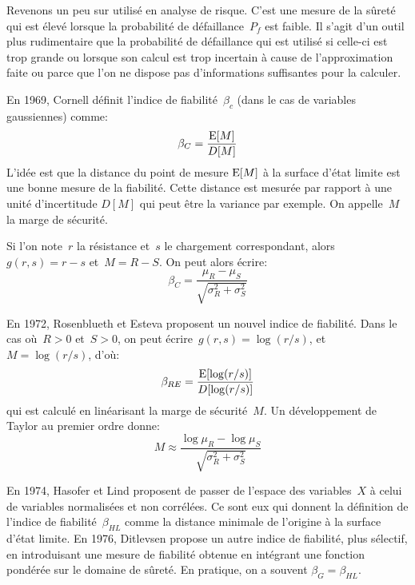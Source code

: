 \begin{histoire}
\medskip\ifVersionDuDocEstVincent\else\vspace{\medskipamount}\fi
Revenons un peu sur  utilisé en analyse de risque. C'est une mesure de la sûreté qui est élevé lorsque la probabilité de défaillance~$P_f$ est faible. Il s'agit d'un outil plus rudimentaire que la probabilité de défaillance qui est utilisé si celle-ci est trop grande ou lorsque son calcul est trop incertain à cause de l'approximation faite ou parce que l'on ne dispose pas d'informations suffisantes pour la calculer.

En 1969, Cornell définit l'indice de fiabilité~$\beta_c$ (dans le cas de variables gaussiennes) comme:
\begin{equation}
\beta_C=\dfrac{\operatorname{E}[M]}{D[M]}
\end{equation}
L'idée est que la distance du point de mesure $\operatorname{E}[M]$ à la surface d'état limite est une bonne mesure de la fiabilité. Cette distance est mesurée par rapport à une unité d'incertitude $D[M]$ qui peut être la variance par exemple. On appelle~$M$ la marge de sécurité.

Si l'on note~$r$ la résistance et~$s$ le chargement correspondant, alors~$g(r,s)=r-s$ et~$M=R-S$. On peut alors écrire:
$$\beta_C=\dfrac{\mu_R-\mu_S}{\sqrt{\sigma_R^2+\sigma_S^2}}$$

En 1972, Rosenblueth et Esteva proposent un nouvel indice de fiabilité. Dans le cas où~$R>0$ et~$S>0$, on peut écrire~$g(r,s)=\log(r/s)$, et~$M=\log(r/s)$, d'où:
\begin{equation}
\beta_{RE}=\dfrac{\operatorname{E}[\log(r/s)]}{D[\log(r/s)]}
\end{equation}
qui est calculé en linéarisant la marge de sécurité~$M$. Un développement de Taylor au premier ordre donne:
$$M\approx\dfrac{\log\mu_R-\log\mu_S}{\sqrt{\sigma_R^2+\sigma_S^2}}$$

En 1974, Hasofer et Lind proposent de passer de l'espace des variables~$X$ à celui de variables normalisées et non corrélées. Ce sont eux qui donnent la définition de l'indice de fiabilité~$\beta_{HL}$ comme la distance minimale de l'origine à la surface d'état limite.
En 1976, Ditlevsen propose un autre indice de fiabilité, plus sélectif, en introduisant une mesure de fiabilité obtenue en intégrant une fonction pondérée sur le domaine de sûreté. En pratique, on a souvent $\beta_G=\beta_{HL}$.
\end{histoire}

